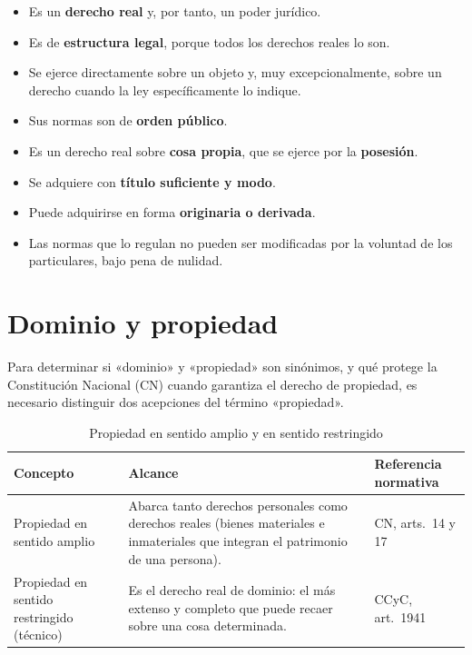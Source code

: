 \documentclass[12pt,oneside]{book}
\begin{document}
\begin{itemize}
    \item Es un \textbf{derecho real} y, por tanto, un poder jurídico.
    \item Es de \textbf{estructura legal}, porque todos los derechos reales lo son.
    \item Se ejerce directamente sobre un objeto y, muy excepcionalmente, sobre un derecho cuando la ley específicamente lo indique.
    \item Sus normas son de \textbf{orden público}.
    \item Es un derecho real sobre \textbf{cosa propia}, que se ejerce por la \textbf{posesión}.
    \item Se adquiere con \textbf{título suficiente y modo}.
    \item Puede adquirirse en forma \textbf{originaria o derivada}.
    \item Las normas que lo regulan no pueden ser modificadas por la voluntad de los particulares, bajo pena de nulidad.
\end{itemize}

\section{Dominio y propiedad}

Para determinar si «dominio» y «propiedad» son sinónimos, y qué protege la Constitución Nacional (CN) cuando garantiza el derecho de propiedad, es necesario distinguir dos acepciones del término «propiedad».

\begin{table}[H]
\centering
\caption{Propiedad en sentido amplio y en sentido restringido}
\small
\begin{tabularx}{\textwidth}{
    >{\raggedright\arraybackslash}p{}
    >{\raggedright\arraybackslash}X
    >{\raggedright\arraybackslash}p{}
}
\toprule
\textbf{Concepto} & \textbf{Alcance} & \textbf{Referencia normativa} \\
\midrule
Propiedad en sentido amplio &
Abarca tanto derechos personales como derechos reales (bienes materiales e inmateriales que integran el patrimonio de una persona). &
CN, arts.~14 y 17 \\
Propiedad en sentido restringido (técnico) &
Es el derecho real de dominio: el más extenso y completo que puede recaer sobre una cosa determinada. &
CCyC, art.~1941 \\
\bottomrule
\end{tabularx}
\end{table}
\end{document}
